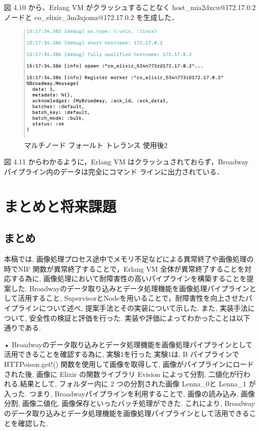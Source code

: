 \documentclass[a4paper]{jreport}	%
\begin{document}
図 4.10 から、Erlang VM がクラッシュすることなく host\_mia2dxcu@172.17.0.2 ノードと co\_elixir\_3m3xjomz@172.17.0.2 を生成した．

\begin{figure}[H]
\vspace{4cm}
\begin{center}
\hspace{-8cm}
\includegraphics[scale=0.5]{ja/f13.png}
\end{center}
\caption{マルチノード フォールト トレランス 使用後2}
\end{figure}

図 4.11 からわかるように，Erlang VM はクラッシュされておらず，Broadway パイプライン内のデータは完全にコマンド ラインに出力されている．




\chapter{まとめと将来課題}
\section{まとめ}
本稿では, 画像処理プロセス途中でメモリ不足などによる異常終了や画像処理の時でNIF 関数が異常終了することで，Erlang VM 全体が異常終了することを対応する為に, 画像処理において耐障害性の高いパイプラインを構築することを提案した. Broadwayのデータ取り込みとデータ処理機能を画像処理パイプラインとして活用すること, SupervisorとNodeを用いることで，耐障害性を向上させたパイプラインについて述べ, 提案手法とその実装について示した. また, 実装手法について, 安全性の検証と評価を行った. 実装や評価によってわかったことは以下通りである. 

• Broadwayのデータ取り込みとデータ処理機能を画像処理パイプラインとして活用できることを確認する為に, 実験1を行った.実験1は, B パイプラインで HTTPoison.get!() 関数を使用して画像を取得して, 画像がパイプラインにロードされた後, 画像に Elixir の関数ライブラリ Evision によって分割, 二値化が行われる.結果として, フォルダー内に 2 つの分割された画像 Lenna\_0と Lenna\_1 が入った. つまり, Broadwayパイプラインを利用することで, 画像の読み込み, 画像分割, 画像二値化, 画像保存といったバッチ処理ができた. これにより, Broadwayのデータ取り込みとデータ処理機能を画像処理パイプラインとして活用できることを確認した.
\end{document}
